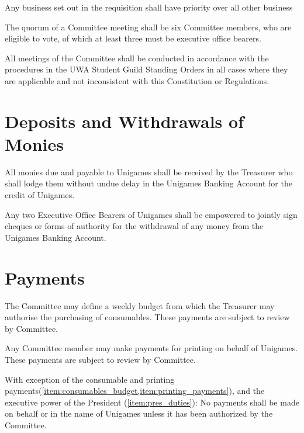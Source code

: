 \documentclass[a4paper]{article}
\begin{document}
\begin{myEnumerate}
\begin{myEnumerate}
\begin{myEnumerate}
                    \end{myEnumerate}
              \item Any business set out in the requisition shall have priority over all other business
          \end{myEnumerate}
    \item The quorum of a Committee meeting shall be six Committee members, who are eligible to vote, of which at least three must be executive office bearers.
    \item All meetings of the Committee shall be conducted in accordance with the procedures in the UWA Student Guild Standing Orders in all cases where they are applicable and not inconsistent with this Constitution or Regulations.
\end{myEnumerate}


\section{Deposits and Withdrawals of Monies} \label{sec:monies}
\begin{myEnumerate}
    \item All monies due and payable to Unigames shall be received by the Treasurer who shall lodge them without undue delay in the Unigames Banking Account for the credit of Unigames.
    \item Any two Executive Office Bearers of Unigames shall be empowered to jointly sign cheques or forms of authority for the withdrawal of any money from the Unigames Banking Account.
\end{myEnumerate}


\section{Payments} \label{sec:payments}
\begin{myEnumerate}
    \item \label{item:consumables_budget}The Committee may define a weekly budget from which the Treasurer may authorise the purchasing of consumables. These payments are subject to review by Committee.
    \item \label{item:printing_payments} Any Committee member may make payments for printing on behalf of Unigames. These payments are subject to review by Committee.
    \item With exception of the consumable and printing payments(\cref{item:consumables_budget,item:printing_payments}), and the executive power of the President (\cref{item:pres_duties}): No payments shall be made on behalf or in the name of Unigames unless it has been authorized by the Committee.
\end{myEnumerate}
\end{document}
